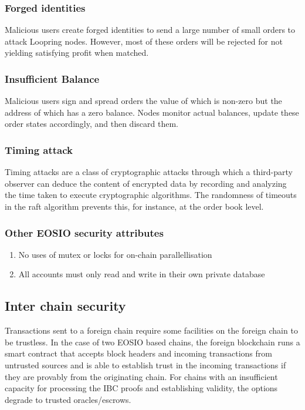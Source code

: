 \documentclass[]{article}
\begin{document}
{\subsubsection{Forged identities}
Malicious users create forged identities to send a large number of small orders to attack Loopring nodes. However, most of these orders will be rejected for not yielding satisfying profit when matched. 

\subsubsection{Insufficient Balance}
Malicious users sign and spread orders the value of which is non-zero but the address of which has a zero balance. Nodes monitor actual balances, update these order states accordingly, and then discard them. 


\subsubsection{Timing attack}
Timing attacks are a class of cryptographic attacks through which a third-party observer can deduce the content of encrypted data 
by recording and analyzing the time taken to execute cryptographic algorithms.
The randomness of timeouts in the raft algorithm prevents this, for instance, at the order book level.

\subsubsection{Other EOSIO security attributes}
\begin{enumerate}
	\item No uses of mutex or locks for on-chain parallellisation
	\item All accounts must only read and write in their own private database
\end{enumerate}

\subsection{Inter chain security}

Transactions sent to a foreign chain require some facilities on the foreign chain to be trustless. 
In the case of two EOSIO based chains, the foreign blockchain runs a smart contract that accepts block headers and incoming transactions from untrusted sources and is able to establish trust in the incoming transactions if they are provably from the originating chain. 
For chains with an insufficient capacity for processing the IBC proofs and establishing validity, the options degrade to trusted oracles/escrows.


}
\end{document}

